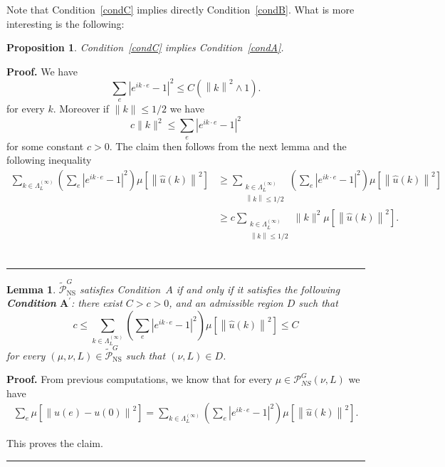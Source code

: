 \documentclass[11pt]{preprint}
\newtheorem{lemma}[theorem]{Lemma}
\newtheorem{problem}[theorem]{Problem}
\newtheorem{proposition}[theorem]{Proposition}
\newenvironment{proof}[1][Proof]{\textbf{#1.} }{\ \rule{0.5em}{0.5em}}
\begin{document}
Note that Condition~\ref{condC} implies directly Condition~\ref{condB}. What is more interesting is the following:

\begin{proposition}
Condition~\ref{condC} implies Condition~\ref{condA}.
\end{proposition}

\begin{proof}
We have
\[
\sum_{e}\left|  e^{ik\cdot e}-1\right|  ^{2}\leq C\left(
\left\|k\right\|^{2}\wedge1\right).
\]
for every $k$.
Moreover if $\|k\| \le 1/2$ we have
\[
c\|k\|^{2} \le \sum_{e}\left|  e^{ik\cdot e}-1\right|  ^{2}
\]
for some constant $c> 0$.
The claim then follows from the next lemma and the following inequality
\begin{align*}
\sum_{k\in\Lambda_{L}^{\left(  \infty\right) } }\left(  \sum_{e}\left|
e^{ik\cdot e}-1\right|  ^{2}\right)  \mu\left[  \left\|  \widehat
{u}\left(  k\right)  \right\|  ^{2}\right]
&\ge \sum_{\substack{k\in\Lambda_{L}^{\left(  \infty\right)  }\\\left\|
k\right\|  \leq 1/2}}\left(  \sum_{e}\left|
e^{ik\cdot e}-1\right|  ^{2}\right)  \mu\left[  \left\|  \widehat
{u}\left(  k\right)  \right\|  ^{2}\right]  
\\ &\ge c \sum_{\substack{k\in\Lambda_{L}^{\left(  \infty\right)  }\\\left\|
k\right\|  \leq 1/2}}\|k\|^{2}  \mu\left[  \left\|  \widehat
{u}\left(  k\right)  \right\|  ^{2}\right]  .
\end{align*}
\end{proof}

\begin{lemma}
\bigskip$\tilde{\mathcal{P}}_{{\mathrm{NS}}}^{G}$ satisfies Condition~$A$ if
and only if it satisfies the following \textbf{Condition }$\mathbf{A}^{\prime
}$: there exist $C>c>0$, and an admissible region $D$ such that
\[
c\leq\sum_{k\in\Lambda^{(\infty)}_L}\left(  \sum_{e}\left|
e^{ik\cdot e}-1\right|  ^{2}\right)  \mu\left[  \left\|  \widehat
{u}\left(  k\right)  \right\|  ^{2}\right]  \leq C
\]
for every $(\mu,\nu,L)\in\tilde{\mathcal{P}}_{{\mathrm{NS}}}^{G}$ such that
$(\nu,L)\in D$.
\end{lemma}

\begin{proof}
From previous computations, we know that for every $\mu\in\mathcal{P}_{NS}%
^{G}\left(  \nu,L\right)  $ we have
\begin{align*}
\sum_{e}\mu\left[  \left\|  u\left(  e\right)  -u(0)\right\|  ^{2}\right]
=\sum_{k\in\Lambda^{\left(  \infty\right)  }_L}\left(  \sum_{e}\left|
e^{ik\cdot e}-1\right|  ^{2}\right)  \mu\left[  \left\|  \widehat
{u}\left(  k\right)  \right\|  ^{2}\right]  .
\end{align*}

This proves the claim.
\end{proof}
%
\end{document}
